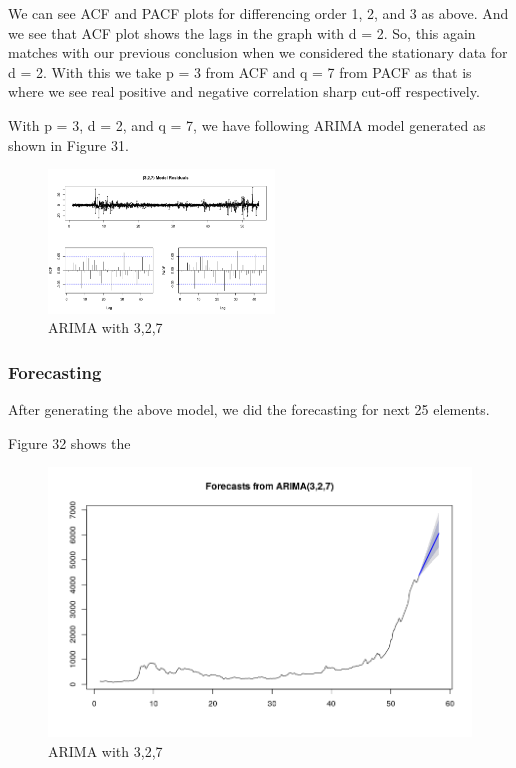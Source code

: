 \documentclass{article}
\begin{document}
We can see ACF and PACF plots for differencing order 1, 2, and 3 as above. And we see that ACF plot shows the lags in the graph with d = 2.
So, this again matches with our previous conclusion when we considered the stationary data for d = 2.
With this we take p = 3 from ACF and q = 7 from PACF as that is where we see real positive and negative correlation sharp cut-off respectively.

With p = 3, d = 2, and q = 7, we have following ARIMA model generated as shown in Figure 31.

\begin{figure}[ht]
	\centering
	\includegraphics[width=6cm]{ARIMAWith327.png}
	\caption{ARIMA with 3,2,7}
	\label{fig: ARIMA with (3,2,7)}
\end{figure}

\newpage
\subsubsection{Forecasting}

After generating the above model, we did the forecasting for next 25 elements.

Figure 32 shows the 

\begin{figure}[ht]
	\centering
	\includegraphics[scale=0.25]{ForecastWith327.png}
	\caption{ARIMA with 3,2,7}
	\label{fig: Forecast with ARIMA(3,2,7)}
\end{figure}
\end{document}
